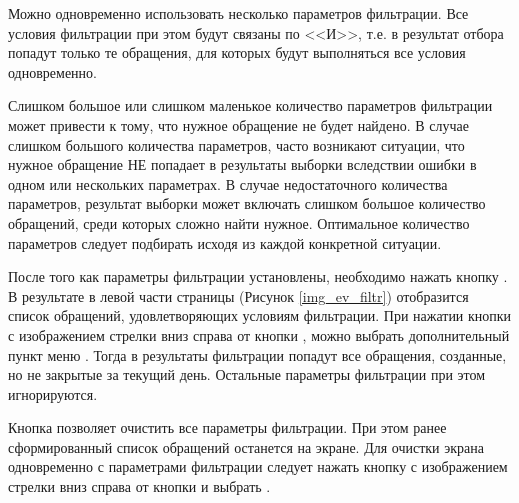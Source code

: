 Можно одновременно использовать несколько параметров фильтрации. Все условия фильтрации при этом будут связаны по <<И>>, т.е. в результат отбора попадут только те обращения, для которых будут выполняться все условия одновременно.

\begin{prim}
 Слишком большое или слишком маленькое количество параметров фильтрации может привести к тому, что нужное обращение не будет найдено. В случае слишком большого количества параметров, часто возникают ситуации, что нужное обращение НЕ попадает в результаты выборки вследствии ошибки в одном или нескольких параметрах. В случае недостаточного количества параметров, результат выборки может включать слишком большое количество обращений, среди которых сложно найти нужное. Оптимальное количество параметров следует подбирать исходя из каждой конкретной ситуации. 
\end{prim}

После того как параметры фильтрации установлены, необходимо нажать кнопку . В результате в левой части страницы (Рисунок \ref{img_ev_filtr}) отобразится список обращений, удовлетворяющих условиям фильтрации. При нажатии кнопки с изображением стрелки вниз справа от кнопки , можно выбрать дополнительный пункт меню . Тогда в результаты фильтрации попадут все обращения, созданные, но не закрытые за текущий день. Остальные параметры фильтрации при этом игнорируются.

Кнопка  позволяет очистить все параметры фильтрации. При этом ранее сформированный список обращений останется на экране. Для очистки экрана одновременно с параметрами фильтрации следует нажать кнопку с изображением стрелки вниз справа от кнопки  и выбрать .
